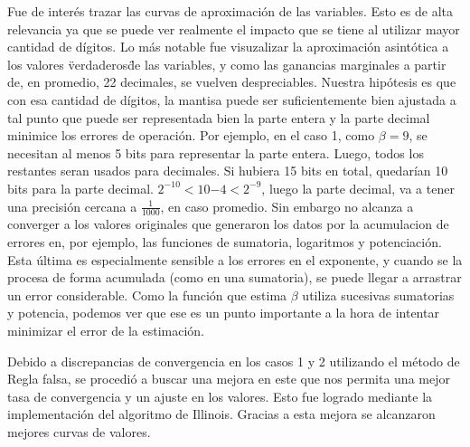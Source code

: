 Fue de inter\'es trazar las curvas de aproximaci\'on de las variables. 
Esto es de alta relevancia ya que se puede ver realmente el impacto que se tiene
al utilizar mayor cantidad de d\'igitos. Lo m\'as notable fue visuzalizar la 
aproximaci\'on asint\'otica a los valores \"verdaderos\" de las variables, 
y como las ganancias marginales a partir de, en promedio, 22 decimales, 
se vuelven despreciables. Nuestra hip\'otesis es que con esa cantidad de 
d\'igitos, la mantisa puede ser suficientemente bien ajustada a tal punto que puede 
ser representada bien la parte entera y la parte decimal minimice los errores de 
operaci\'on. Por ejemplo, en el caso 1, como $\beta = 9$, se necesitan al menos 
5 bits para representar la parte entera. Luego, todos los restantes seran usados 
para decimales. Si hubiera 15 bits en total, quedar\'ian 10 bits para la parte 
decimal. $2^{-10}<10{-4}<2^{-9}$, luego la parte decimal, va a tener una
precisi\'on cercana a $\frac{1}{1000}$, en caso promedio. 
Sin embargo no alcanza a converger a los valores originales que generaron los 
datos por la acumulacion de errores en, por ejemplo, las funciones
de sumatoria, logaritmos y potenciaci\'on. Esta \'ultima es especialmente 
sensible a los errores en el exponente, y cuando se la procesa de forma 
acumulada (como en una sumatoria), se puede llegar a arrastrar un error
considerable. Como la funci\'on que estima
$\beta$ utiliza sucesivas sumatorias y potencia, podemos ver que ese es un punto 
importante a la hora de intentar minimizar el error de la estimaci\'on.

Debido a discrepancias de convergencia en los casos 1 y 2 utilizando el m\'etodo
de Regla falsa, se procedi\'o a buscar una mejora en este que nos permita una mejor
tasa de convergencia y un ajuste en los valores. Esto fue logrado mediante la
implementaci\'on del algoritmo de Illinois. Gracias a esta mejora se alcanzaron 
mejores curvas de valores.

